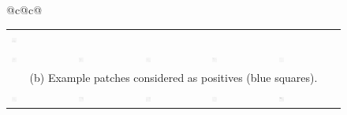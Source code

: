 \begin{figure}
\begin{tabular}{@{}c@{\hspace{0.05\textwidth}}c@{}}
\begin{tabular}{@{}p{}@{}p{}@{}p{}@{}p{}@{}p{}@{}}
			\includegraphics[width=0.085\textwidth]{fig01b10} \\
			\includegraphics[width=0.085\textwidth]{fig01b11} &
			\includegraphics[width=0.085\textwidth]{fig01b12} &
			\includegraphics[width=0.085\textwidth]{fig01b13} &
			\includegraphics[width=0.085\textwidth]{fig01b14} &
			\includegraphics[width=0.085\textwidth]{fig01b15} \\[1ex]
			\multicolumn{5}{c}{(b) Example patches considered as positives (blue squares).} \\[4ex]
			\includegraphics[width=0.085\textwidth]{fig01c01} &
			\includegraphics[width=0.085\textwidth]{fig01c02} &
			\includegraphics[width=0.085\textwidth]{fig01c03} &
			\includegraphics[width=0.085\textwidth]{fig01c04} &
			\includegraphics[width=0.085\textwidth]{fig01c05} \\

\end{tabular}
\end{tabular}
\end{figure}
